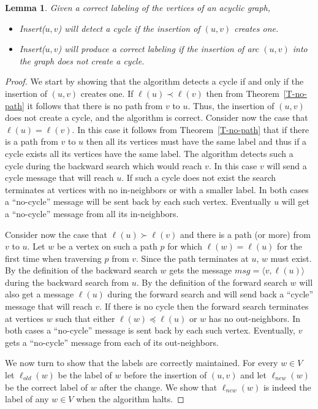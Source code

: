 \documentclass[11pt]{article}
\theoremstyle{plain}
\newtheorem{lem}[thm]{Lemma}
\theoremstyle{definition}
\theoremstyle{remark}
\numberwithin{equation}{section}
\DeclareMathOperator{\glex}{\prec}
\DeclareMathOperator{\geqlex}{\preceq}
\DeclareMathOperator{\llex}{\succ}
\begin{document}
\begin{lem}
Given a correct labeling of the vertices of an acyclic graph,
\begin{itemize}
  \item Insert($u,v$) will detect a cycle if the insertion of $(u,v)$ creates one.
  \item Insert($u,v$) will produce a correct labeling if the insertion of arc $(u,v)$ into the graph does not create a cycle.
\end{itemize}
\end{lem}
\begin{proof}

We start by showing that the algorithm detects a cycle if and only
if the insertion of $(u,v)$ creates one. If $\ell(u) \glex \ell(v)$
then from Theorem~\ref{T-no-path} it follows that there is no path
from $v$ to $u$. Thus, the insertion of $(u,v)$ does not create a
cycle, and the algorithm is correct. Consider now the case that
$\ell(u)=\ell(v)$. In this case it follows from
Theorem~\ref{T-no-path} that if there is a path from $v$ to $u$ then
all its vertices must have the same label and thus if a cycle exists
all its vertices have the same label. The algorithm detects such a
cycle during the backward search which would reach $v$. In this case
$v$ will send a cycle message that will reach $u$. If such a cycle
does not exist the search terminates at vertices with no
in-neighbors or with a smaller label. In both cases a ``no-cycle''
message will be sent back by each such vertex. Eventually $u$ will
get a ``no-cycle'' message from all its in-neighbors.

Consider now the case that $\ell(u)\llex \ell(v)$ and there is a
path (or more) from $v$ to $u$. Let $w$ be a vertex on such a path
$p$ for which $\ell(w)=\ell(u)$ for the first time when traversing
$p$ from $v$. Since the path terminates at $u$,  $w$ must exist. By
the definition of the backward search  $w$ gets the message
$msg=\langle v,\ell(u)\rangle$ during the backward search from $u$.  By the
definition of the forward search  $w$ will also get a message
 $\ell(u)$  during the forward search and will send back a ``cycle'' message that will reach $v$.
  If there is
no cycle then the forward search terminates at vertices $w$ such
that either $\ell(w)\geqlex \ell(u)$ or $w$ has no out-neighbors. In
both cases a ``no-cycle'' message is sent back by each such vertex.
Eventually, $v$ gets  a ``no-cycle'' message from each of its
out-neighbors.

We now turn to show that the labels are correctly maintained. For
every $w\in V$ let $\ell_{old}(w)$ be the label of $w$  before the
insertion of $(u,v)$ and let $\ell_{new}(w)$ be the correct label of
$w$ after the change. We show that $\ell_{new}(w)$ is indeed the
label of any $w\in V$ when the algorithm halts.


\end{proof}
\end{document}
